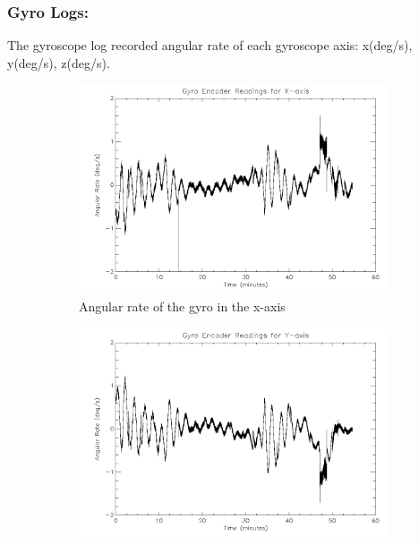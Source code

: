 {\newpage
\subsubsection*{Gyro Logs:}
The gyroscope log recorded angular rate of each gyroscope axis: x(deg/s), y(deg/s), z(deg/s).

\begin{figure}[htbp]
\captionsetup[subfigure]{justification=centering}
\captionsetup{justification=centering}
    \centering
	\begin{subfigure}{0.45\textwidth}
		\includegraphics[width=1\linewidth]{appendix/img/campaign_results/gyrox.png}
		\caption{Angular rate of the gyro in the x-axis}
		\label{fig:sub:gyrox}
	\end{subfigure}
	\begin{subfigure}{0.45\textwidth}
		\includegraphics[width=1\linewidth]{appendix/img/campaign_results/gyroy.png}

\end{subfigure}
\end{figure}}
